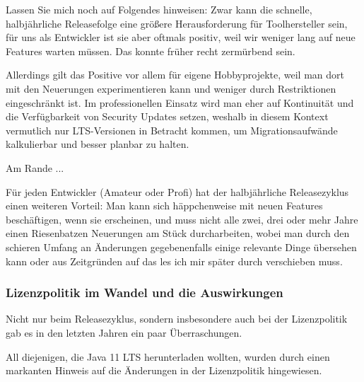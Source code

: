 Lassen Sie mich noch auf Folgendes hinweisen:
Zwar kann die schnelle, halbjähr\-liche Releasefolge eine größere Herausforderung für Toolhersteller sein,
für uns als Entwickler ist sie aber oftmals positiv, weil wir weniger lang auf neue
Features warten müssen.  Das konnte früher recht zermürbend sein.


Allerdings gilt das Positive vor allem für eigene Hobbyprojekte, weil man dort
mit den Neuerungen experimentieren kann und weniger durch Restriktionen
eingeschränkt ist.
Im professionellen Einsatz wird man eher auf Kontinuität und die Verfügbarkeit
von Security Updates setzen, weshalb in diesem Kontext vermutlich nur
LTS-Versionen in Betracht kommen, um Migrationsaufwände kalkulierbar und
 besser planbar zu halten.




\begin{praxistipp}{Am Rande ...}
\begin{center}
\begin{minipage}{\textwidth-0.6cm}
Für jeden Entwickler (Amateur oder Profi) hat der halbjährliche Releasezyklus
einen weiteren Vorteil:
Man kann sich häppchenweise mit neuen Features beschäftigen, wenn sie erscheinen, und
muss nicht alle zwei, drei oder mehr Jahre einen Riesenbatzen Neuerungen am Stück durcharbeiten,
wobei man  durch den schieren Umfang an Änderungen gegebenenfalls einige relevante Dinge übersehen
kann oder  aus Zeitgründen auf \frqq das les ich mir später durch\flqq{} verschieben muss.
\end{minipage}
\end{center}
\end{praxistipp}




\subsubsection{Lizenzpolitik im Wandel und die Auswirkungen}


Nicht nur beim Releasezyklus, sondern insbesondere auch bei der Lizenzpolitik
gab es in den letzten Jahren ein paar Überraschungen.


All diejenigen, die Java 11 LTS herunterladen wollten, wurden durch einen
markanten Hinweis auf die Änderungen in der Lizenzpolitik hingewiesen.


